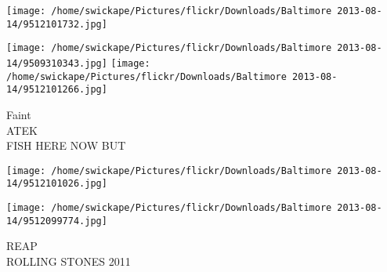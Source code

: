\documentclass[10pt,letterpaper]{article}
\begin{document}
\texttt{[image: /home/swickape/Pictures/flickr/Downloads/Baltimore 2013-08-14/9512101732.jpg]}

\vspace{0.25in}
\texttt{[image: /home/swickape/Pictures/flickr/Downloads/Baltimore 2013-08-14/9509310343.jpg]}
\texttt{[image: /home/swickape/Pictures/flickr/Downloads/Baltimore 2013-08-14/9512101266.jpg]}

Faint\\
ATEK\\
FISH HERE NOW BUT
\pagebreak

\texttt{[image: /home/swickape/Pictures/flickr/Downloads/Baltimore 2013-08-14/9512101026.jpg]}

\vspace{0.25in}
\texttt{[image: /home/swickape/Pictures/flickr/Downloads/Baltimore 2013-08-14/9512099774.jpg]}

REAP\\
ROLLING STONES 2011
\pagebreak
\end{document}
